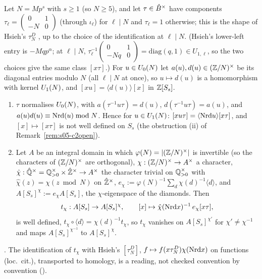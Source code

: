 \begin{lemma}\label{lem:s05-normtwist}
Let $N=Mp^s$ with $s\ge1$ (so $N\ge5$), and let $\tau\in\hat{B}^\times$ have components $\tau_\ell=\left(\begin{smallmatrix}0&1\\-N&0\end{smallmatrix}\right)$ (through $\iota_\ell$) for
$\ell\mid N$ and $\tau_\ell=1$ otherwise; this is the shape of Hsieh's $\tau^D_N$ , up to the choice of the identification at $\ell\mid N$. (Hsieh's lower-left entry is $-Mqp^\alpha$; at $\ell\mid N$,
$\tau_\ell^{-1}\left(\begin{smallmatrix}0&1\\-Nq&0\end{smallmatrix}\right)=\mathrm{diag}(q,1)\in U_{1,\ell}$, so the two choices give the same class $[x\tau]$.) For $u\in U_0(N)$ let $a(u),d(u)\in(\mathbb{Z}/N)^\times$ be its diagonal entries
modulo $N$ (all $\ell\mid N$ at once), so $u\mapsto d(u)$ is a homomorphism with kernel $U_1(N)$, and $[xu]=\langle d(u)\rangle[x]$ in $\mathbb{Z}[S_s]$.
\begin{enumerate}[label=(\alph*)]
\item $\tau$ normalises $U_0(N)$, with $a(\tau^{-1}u\tau)=d(u)$, $d(\tau^{-1}u\tau)=a(u)$, and $a(u)d(u)\equiv\mathrm{Nrd}(u)\bmod N$. Hence for
  $u\in U_1(N)$: $[xu\tau]=\langle\mathrm{Nrd} u\rangle[x\tau]$, and $[x]\mapsto[x\tau]$ is not well defined on $S_s$ (the obstruction (ii) of
  Remark~\ref{rem:s05-c2open}).
\item Let $A$ be an integral domain in which $\varphi(N)=|(\mathbb{Z}/N)^\times|$ is invertible (so the characters of $(\mathbb{Z}/N)^\times$ are orthogonal), $\chi:(\mathbb{Z}/N)^\times\to A^\times$ a character,
  $\hat\chi:\hat{\mathbb{Q}}^\times=\mathbb{Q}^\times_{>0}\times\hat{\mathbb{Z}}^\times\to A^\times$ the character trivial on $\mathbb{Q}^\times_{>0}$ with $\hat\chi(z)=\chi(z\bmod N)$ on $\hat{\mathbb{Z}}^\times$,
  $e_\chi:=\varphi(N)^{-1}\sum_d\chi(d)^{-1}\langle d\rangle$, and $A[S_s]^\chi:=e_\chi A[S_s]$, the $\chi$-eigenspace of the diamonds. Then
  \[t_\chi:A[S_s]\to A[S_s]^\chi,\qquad [x]\mapsto\hat\chi(\mathrm{Nrd} x)^{-1}\,e_\chi[x\tau],\]
  is well defined, $t_\chi\circ\langle d\rangle=\chi(d)^{-1}t_\chi$, so $t_\chi$ vanishes on $A[S_s]^{\chi'}$ for $\chi'\ne\chi^{-1}$ and maps
  $A[S_s]^{\chi^{-1}}$ to $A[S_s]^\chi$.
\end{enumerate}
\stproved. The identification of $t_\chi$ with Hsieh's $[\tau^D_N]$, $f\mapsto f(x\tau^D_N)\chi(\mathrm{Nrd} x)$ on functions (loc.\ cit.), transported to homology,
is a reading, not checked convention by convention (\stsketch).
\end{lemma}
